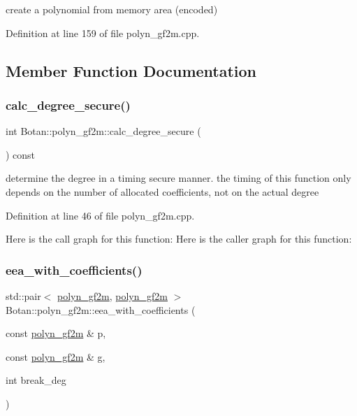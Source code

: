 create a polynomial from memory area (encoded) 

Definition at line 159 of file polyn\+\_\+gf2m.\+cpp.



\subsection{Member Function Documentation}
\mbox{\label{class_botan_1_1polyn__gf2m_ac2b94d1eddf27838f4fcf03db4f8ac08}} 
\subsubsection{\texorpdfstring{calc\+\_\+degree\+\_\+secure()}{calc\_degree\_secure()}}
{\footnotesize\ttfamily int Botan\+::polyn\+\_\+gf2m\+::calc\+\_\+degree\+\_\+secure (\begin{DoxyParamCaption}{ }\end{DoxyParamCaption}) const}

determine the degree in a timing secure manner. the timing of this function only depends on the number of allocated coefficients, not on the actual degree 

Definition at line 46 of file polyn\+\_\+gf2m.\+cpp.

Here is the call graph for this function\+:
Here is the caller graph for this function\+:
\mbox{\label{class_botan_1_1polyn__gf2m_a34abf02cef12e433c78046c758b4efe6}} 
\subsubsection{\texorpdfstring{eea\+\_\+with\+\_\+coefficients()}{eea\_with\_coefficients()}}
{\footnotesize\ttfamily std\+::pair$<$ \mbox{\hyperlink{class_botan_1_1polyn__gf2m}{polyn\+\_\+gf2m}}, \mbox{\hyperlink{class_botan_1_1polyn__gf2m}{polyn\+\_\+gf2m}} $>$ Botan\+::polyn\+\_\+gf2m\+::eea\+\_\+with\+\_\+coefficients (\begin{DoxyParamCaption}\item[{const \mbox{\hyperlink{class_botan_1_1polyn__gf2m}{polyn\+\_\+gf2m}} \&}]{p,  }\item[{const \mbox{\hyperlink{class_botan_1_1polyn__gf2m}{polyn\+\_\+gf2m}} \&}]{g,  }\item[{int}]{break\+\_\+deg }\end{DoxyParamCaption})\hspace{0.3cm}{\ttfamily [static]}}

